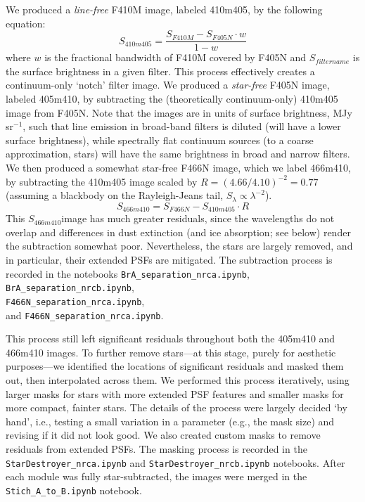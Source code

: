 \documentclass[times,astrosymb,twocolumn]{aastex631}
\def\todo#1{\textcolor{red}{#1}}
\def\rr#1{#1}
\begin{document}
We produce\rr{d} a \textit{line-free} F410M image, labeled 410m405, \rr{by the following equation: 
\begin{equation}
S_{410m405} = \frac{S_{F410M} - S_{F405N} \cdot w}{1 - w}
\end{equation}
where $w$ is the fractional bandwidth of F410M covered by F405N \rr{and $S_{filtername}$ is the surface brightness in a given filter}.
This process effectively creates a continuum-only `notch' filter image}.
We produce\rr{d} a \textit{star-free} F405N image, labeled 405m410, by subtracting the (theoretically continuum-only) 410m405 image \rr{from F405N}.
\rr{Note that the images are in units of surface brightness, MJy sr$^{-1}$, such that line emission in broad-band filters is diluted (will have a lower surface brightness), while spectrally flat continuum sources (to a coarse approximation, stars) will have the same brightness in broad and narrow filters.}
We then produce\rr{d} a somewhat star-free F466N image, which we label 466m410, by subtracting the 410m405 image scaled by \rr{$R=(4.66/4.10)^{-2} = 0.77$ (assuming a blackbody on the Rayleigh-Jeans tail, $S_\lambda\propto\lambda^{-2}$)}.
\begin{equation}
S_{466m410} = S_{F466N} - S_{410m405} \cdot R
\end{equation}
This \rr{$S_{466m410}$}image has much greater residuals, since the wavelengths do not overlap and differences in dust extinction (and ice absorption; see below) render the subtraction somewhat poor.
Nevertheless, the stars are largely removed, and in particular, their extended PSFs are mitigated.
The subtraction process is recorded in the notebooks \texttt{BrA\_separation\_nrca.ipynb},\\
\texttt{BrA\_separation\_nrcb.ipynb},\\
\texttt{F466N\_separation\_nrca.ipynb},\\
and \texttt{F466N\_separation\_nrca.ipynb}.

This process still left significant residuals throughout both the 405m410 and 466m410 images.
To further remove stars---at this stage, purely for aesthetic purposes---we identif\rr{ied} the locations of significant residuals and masked them out, then interpolate\rr{d} across them.
We perform\rr{ed} this process iteratively, using larger masks for stars with more extended PSF features and smaller masks for more compact, fainter stars.
The details of the process were largely decided `by hand', i.e., testing a small variation in a parameter (e.g., the mask size) and revising if it did not look good.
We also created custom masks to remove residuals from extended PSFs.
The masking process is recorded in the \texttt{StarDestroyer\_nrca.ipynb} and \texttt{StarDestroyer\_nrcb.ipynb} notebooks.
After each module was fully star-subtracted, the images were merged in the \texttt{Stich\_A\_to\_B.ipynb} notebook.
\end{document}
